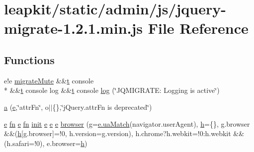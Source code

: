 \hypertarget{jquery-migrate-1_82_81_8min_8js}{\section{leapkit/static/admin/js/jquery-\/migrate-\/1.2.1.min.\-js File Reference}
\label{jquery-migrate-1_82_81_8min_8js}
}
\subsection*{Functions}
\begin{DoxyCompactItemize}
\item 
e!e \hyperlink{jquery-migrate-1_82_81_8min_8js_ae195c77203e798bee6ede6c8c76c56ae}{migrate\-Mute} \&\&\hyperlink{static_2root_2js_2bootstrap_2jquery-ui-1_810_84_8custom_8min_8js_acf335ef347969ef6dc8387e680fb289e}{t} console \\*
\&\&\hyperlink{static_2root_2js_2bootstrap_2jquery-ui-1_810_84_8custom_8min_8js_acf335ef347969ef6dc8387e680fb289e}{t} console log \&\&\hyperlink{static_2root_2js_2bootstrap_2jquery-ui-1_810_84_8custom_8min_8js_acf335ef347969ef6dc8387e680fb289e}{t} console \hyperlink{jquery-migrate-1_82_81_8min_8js_aab8655c63335be4154bdc4165547623e}{log} (\char`\"{}J\-Q\-M\-I\-G\-R\-A\-T\-E\-: Logging is active\char`\"{})
\item 
\hyperlink{jquery-migrate-1_82_81_8min_8js_af314935beaa8ea5cda1aa9bfb7e046b5}{a} (\hyperlink{static_2root_2js_2jquery-ui_8custom_8min_8js_abea95a4e94bc6f4151d5683d4c12c3f4}{e},\char`\"{}attr\-Fn\char`\"{}, o$\vert$$\vert$\{\},\char`\"{}j\-Query.\-attr\-Fn is deprecated\char`\"{})
\item 
\hyperlink{static_2root_2js_2jquery-ui_8custom_8min_8js_abea95a4e94bc6f4151d5683d4c12c3f4}{e} \hyperlink{static_2root_2js_2jquery-ui_8custom_8min_8js_a6b994a5676f34c0707c73fcd2a61d65d}{fn} \hyperlink{static_2root_2js_2jquery-ui_8custom_8min_8js_abea95a4e94bc6f4151d5683d4c12c3f4}{e} \hyperlink{static_2root_2js_2jquery-ui_8custom_8min_8js_a6b994a5676f34c0707c73fcd2a61d65d}{fn} \hyperlink{jquery-migrate-1_82_81_8min_8js_afa61e9d398b270d554318847ceeaedc7}{init} \hyperlink{static_2root_2js_2jquery-ui_8custom_8min_8js_abea95a4e94bc6f4151d5683d4c12c3f4}{e} \hyperlink{static_2root_2js_2jquery-ui_8custom_8min_8js_abea95a4e94bc6f4151d5683d4c12c3f4}{e} \hyperlink{static_2root_2js_2jquery-ui_8custom_8min_8js_abea95a4e94bc6f4151d5683d4c12c3f4}{e} \hyperlink{jquery-migrate-1_82_81_8min_8js_acc1ba4586242adc2e962ab3f4b55f78b}{browser} (\hyperlink{jquery-migrate-1_82_81_8min_8js_a103df269476e78897c9c4c6cb8f4eb06}{g}=\hyperlink{jquery-migrate-1_82_81_8min_8js_a83209627bbcd8e472c524d831c48cb9b}{e.\-ua\-Match}(navigator.\-user\-Agent), \hyperlink{jquery-migrate-1_82_81_8min_8js_a79fe0eb780a2a4b5543b4dddf8b6188a}{h}=\{\}, g.\-browser \&\&(\hyperlink{jquery-migrate-1_82_81_8min_8js_a79fe0eb780a2a4b5543b4dddf8b6188a}{h}\mbox{[}g.\-browser\mbox{]}=!0, h.\-version=g.\-version), h.\-chrome?h.\-webkit=!0\-:h.\-webkit \&\&(h.\-safari=!0), e.\-browser=\hyperlink{jquery-migrate-1_82_81_8min_8js_a79fe0eb780a2a4b5543b4dddf8b6188a}{h})
$$
\end{DoxyCompactItemize}
